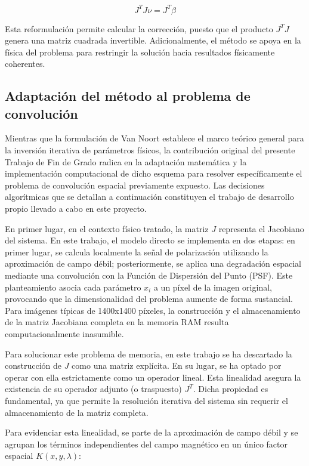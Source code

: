 \begin{equation}
    J^T J \nu = J^T \beta \label{eq:sistemaResolver}
\end{equation}

Esta reformulación permite calcular la corrección, puesto que el producto $J^T J$ genera una matriz cuadrada invertible. Adicionalmente, el método se apoya en la física del problema para restringir la solución hacia resultados físicamente coherentes.

\subsection{Adaptación del método al problema de convolución}

Mientras que la formulación de Van Noort establece el marco teórico general para la inversión iterativa de parámetros físicos, la contribución original del presente Trabajo de Fin de Grado radica en la adaptación matemática y la implementación computacional de dicho esquema para resolver específicamente el problema de convolución espacial previamente expuesto. Las decisiones algorítmicas que se detallan a continuación constituyen el trabajo de desarrollo propio llevado a cabo en este proyecto.

En primer lugar, en el contexto físico tratado, la matriz $J$ representa el Jacobiano del sistema. En este trabajo, el modelo directo se implementa en dos etapas: en primer lugar, se calcula localmente la señal de polarización utilizando la aproximación de campo débil; posteriormente, se aplica una degradación espacial mediante una convolución con la Función de Dispersión del Punto (PSF). Este planteamiento asocia cada parámetro $x_i$ a un píxel de la imagen original, provocando que la dimensionalidad del problema aumente de forma sustancial. Para imágenes típicas de 1400x1400 píxeles, la construcción y el almacenamiento de la matriz Jacobiana completa en la memoria RAM resulta computacionalmente inasumible.

Para solucionar este problema de memoria, en este trabajo se ha descartado la construcción de $J$ como una matriz explícita. En su lugar, se ha optado por operar con ella estrictamente como un operador lineal. Esta linealidad asegura la existencia de su operador adjunto (o traspuesto) $J^T$. Dicha propiedad es fundamental, ya que permite la resolución iterativa del sistema sin requerir el almacenamiento de la matriz completa.

Para evidenciar esta linealidad, se parte de la aproximación de campo débil y se agrupan los términos independientes del campo magnético en un único factor espacial $K(x, y, \lambda)$:

